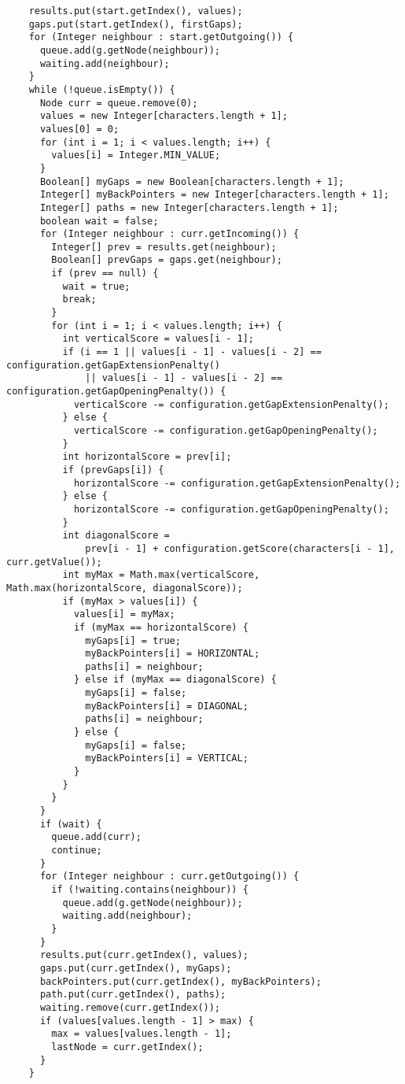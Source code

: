 \documentclass[thesis.tex]{subfiles}
\begin{document}
\begin{lstlisting}
    results.put(start.getIndex(), values);
    gaps.put(start.getIndex(), firstGaps);
    for (Integer neighbour : start.getOutgoing()) {
      queue.add(g.getNode(neighbour));
      waiting.add(neighbour);
    }
    while (!queue.isEmpty()) {
      Node curr = queue.remove(0);
      values = new Integer[characters.length + 1];
      values[0] = 0;
      for (int i = 1; i < values.length; i++) {
        values[i] = Integer.MIN_VALUE;
      }
      Boolean[] myGaps = new Boolean[characters.length + 1];
      Integer[] myBackPointers = new Integer[characters.length + 1];
      Integer[] paths = new Integer[characters.length + 1];
      boolean wait = false;
      for (Integer neighbour : curr.getIncoming()) {
        Integer[] prev = results.get(neighbour);
        Boolean[] prevGaps = gaps.get(neighbour);
        if (prev == null) {
          wait = true;
          break;
        }
        for (int i = 1; i < values.length; i++) {
          int verticalScore = values[i - 1];
          if (i == 1 || values[i - 1] - values[i - 2] == configuration.getGapExtensionPenalty()
              || values[i - 1] - values[i - 2] == configuration.getGapOpeningPenalty()) {
            verticalScore -= configuration.getGapExtensionPenalty();
          } else {
            verticalScore -= configuration.getGapOpeningPenalty();
          }
          int horizontalScore = prev[i];
          if (prevGaps[i]) {
            horizontalScore -= configuration.getGapExtensionPenalty();
          } else {
            horizontalScore -= configuration.getGapOpeningPenalty();
          }
          int diagonalScore =
              prev[i - 1] + configuration.getScore(characters[i - 1], curr.getValue());
          int myMax = Math.max(verticalScore, Math.max(horizontalScore, diagonalScore));
          if (myMax > values[i]) {
            values[i] = myMax;
            if (myMax == horizontalScore) {
              myGaps[i] = true;
              myBackPointers[i] = HORIZONTAL;
              paths[i] = neighbour;
            } else if (myMax == diagonalScore) {
              myGaps[i] = false;
              myBackPointers[i] = DIAGONAL;
              paths[i] = neighbour;
            } else {
              myGaps[i] = false;
              myBackPointers[i] = VERTICAL;
            }
          }
        }
      }
      if (wait) {
        queue.add(curr);
        continue;
      }
      for (Integer neighbour : curr.getOutgoing()) {
        if (!waiting.contains(neighbour)) {
          queue.add(g.getNode(neighbour));
          waiting.add(neighbour);
        }
      }
      results.put(curr.getIndex(), values);
      gaps.put(curr.getIndex(), myGaps);
      backPointers.put(curr.getIndex(), myBackPointers);
      path.put(curr.getIndex(), paths);
      waiting.remove(curr.getIndex());
      if (values[values.length - 1] > max) {
        max = values[values.length - 1];
        lastNode = curr.getIndex();
      }
    }


\end{lstlisting}
\end{document}
